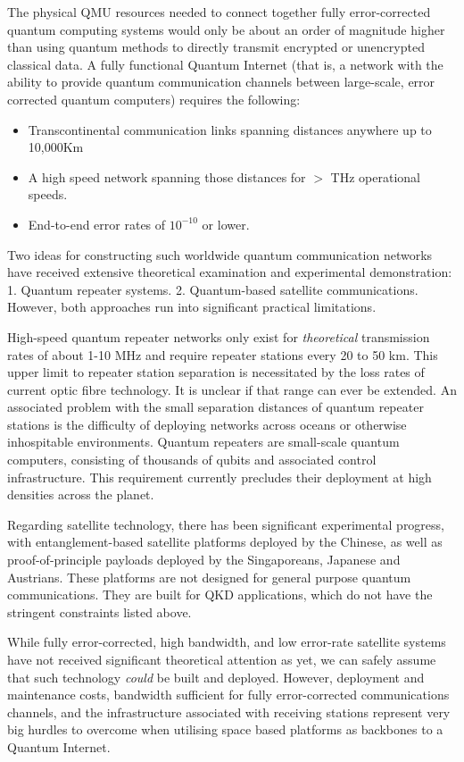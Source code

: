 \documentclass[twocolumn, aps, rmp, amsmath, amssymb, nofootinbib, superscriptaddress, longbibliography, floatfix, table-of-contents, eqsecnum]{revtex4-2}
\begin{document}
The physical QMU resources needed to connect together fully error-corrected quantum computing systems would only be about an order of magnitude higher than using quantum methods to directly transmit encrypted or unencrypted classical data. A fully functional Quantum Internet (that is, a network with the ability to provide quantum communication channels between large-scale, error corrected quantum computers) requires the following:
\begin{itemize}
\item Transcontinental communication links spanning distances anywhere up to 10,000Km
\item A high speed network spanning those distances for $>$ THz operational speeds.
\item End-to-end error rates of $10^{-10}$ or lower.
\end{itemize}

Two ideas for constructing such worldwide quantum communication networks have received extensive theoretical examination and experimental demonstration: 1. Quantum repeater systems. 2. Quantum-based satellite communications. However, both approaches run into significant practical limitations.

High-speed quantum repeater networks only exist for \textit{theoretical} transmission rates of about 1-10 MHz and require repeater stations every 20 to 50 km. This upper limit to repeater station separation is necessitated by the loss rates of current optic fibre technology. It is unclear if that range can ever be extended. An associated problem with the small separation distances of quantum repeater stations is the difficulty of deploying networks across oceans or otherwise inhospitable environments. Quantum repeaters are small-scale quantum computers, consisting of thousands of qubits and associated control infrastructure. This requirement currently precludes their deployment at high densities across the planet. 

Regarding satellite technology, there has been significant experimental progress, with entanglement-based satellite platforms deployed by the Chinese, as well as proof-of-principle payloads deployed by the Singaporeans, Japanese and Austrians. These platforms are not designed for general purpose quantum communications. They are built for QKD applications, which do not have the stringent constraints listed above. 

While fully error-corrected, high bandwidth, and low error-rate satellite systems have not received significant theoretical attention as yet, we can safely assume that such technology \textit{could} be built and deployed. However, deployment and maintenance costs, bandwidth sufficient for fully error-corrected communications channels, and the infrastructure associated with receiving stations represent very big hurdles to overcome when utilising space based platforms as backbones to a Quantum Internet. 
\end{document}
